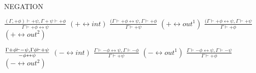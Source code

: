 \documentclass[]{article}
\begin{document}
NEGATION

$\frac{(\Gamma, +\phi) \vdash +\psi, \Gamma +\psi \vdash +\phi}{\Gamma \vdash +\phi\leftrightarrow\psi}$ $(+\leftrightarrow int)$
$\frac{(\Gamma \vdash +\phi\leftrightarrow\psi, \Gamma \vdash +\phi}{\Gamma \vdash +\psi}$ $(+\leftrightarrow out^{1})$
$\frac{(\Gamma \vdash +\phi\leftrightarrow\psi, \Gamma \vdash +\psi}{\Gamma \vdash +\phi}$ $(+\leftrightarrow out^{2})$

$\frac{\Gamma +\phi \vdash -\psi, \Gamma \-\phi \vdash +\psi}{-\phi\leftrightarrow\psi}$ $(-\leftrightarrow int)$
$\frac{\Gamma \vdash -\phi\leftrightarrow\psi, \Gamma \vdash -\phi}{\Gamma \vdash +\psi}$ $(-\leftrightarrow out^{1})$
$\frac{\Gamma \vdash -\phi\leftrightarrow\psi, \Gamma \vdash -\psi}{\Gamma \vdash +\phi}$ $(-\leftrightarrow out^{2})$
\end{document}
